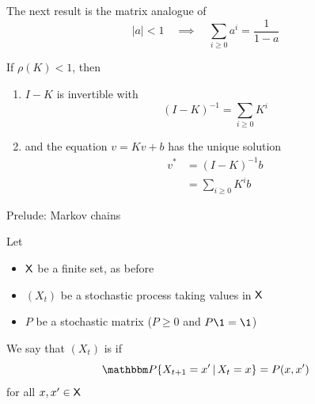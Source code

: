\documentclass[dvipsnames]{beamer}
\begin{document}
\begin{frame}

   The next result is the matrix analogue of 
   \begin{equation*}
       |a| < 1
       \quad \implies \quad
       \sum_{i \geq 0} a^i = \frac{1}{1-a}
   \end{equation*}


   \Thm If $\rho(K) < 1$, then 
   \begin{enumerate}
       \item $I-K$ is invertible with
           \begin{equation*}
               (I-K)^{-1} = \sum_{i \geq 0} K^i
           \end{equation*}
       \item and the equation $v = Kv + b$ has the unique solution 
           \begin{align*}
               v^* & = (I - K)^{-1} b 
                   \\
                   & = \sum_{i \geq 0} K^i b
           \end{align*}
   \end{enumerate}

   \medskip



\end{frame}

\begin{frame}{Prelude: Markov chains}

    Let
    \begin{itemize}
        \item $\mathsf X$ be a finite set, as before
            \medskip
        \item $(X_t)$ be a stochastic process taking values in $\mathsf X$
            \medskip
        \item $P$ be a stochastic matrix ($P \geq 0$ and $P \1 = \1$)
    \end{itemize}
    
    \medskip
    We say that $(X_t)$ is  if
    \begin{equation*}
        \text{$\PP\{X_{t+1} = x' \given X_t = x\} = P(x, x')$}
    \end{equation*}
    for all $x, x' \in \mathsf X$

\end{frame}
\end{document}
